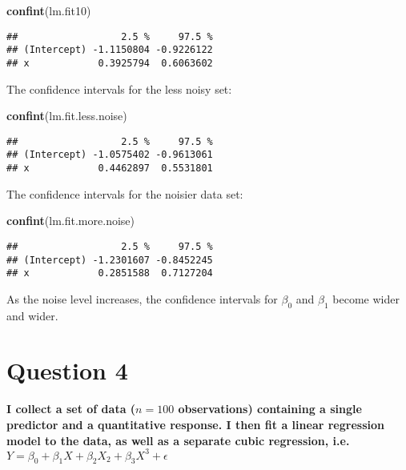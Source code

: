 \documentclass[
]{article}
\newenvironment{Shaded}{\begin{snugshade}}{\end{snugshade}}
\newcommand{\FunctionTok}[1]{\textcolor[rgb]{0.13,0.29,0.53}{\textbf{#1}}}
\newcommand{\NormalTok}[1]{#1}
\begin{document}
\begin{Shaded}
\begin{Highlighting}[]
\FunctionTok{confint}\NormalTok{(lm.fit10)}
\end{Highlighting}
\end{Shaded}

\begin{verbatim}
##                  2.5 %     97.5 %
## (Intercept) -1.1150804 -0.9226122
## x            0.3925794  0.6063602
\end{verbatim}

The confidence intervals for the less noisy set:

\begin{Shaded}
\begin{Highlighting}[]
\FunctionTok{confint}\NormalTok{(lm.fit.less.noise)}
\end{Highlighting}
\end{Shaded}

\begin{verbatim}
##                  2.5 %     97.5 %
## (Intercept) -1.0575402 -0.9613061
## x            0.4462897  0.5531801
\end{verbatim}

The confidence intervals for the noisier data set:

\begin{Shaded}
\begin{Highlighting}[]
\FunctionTok{confint}\NormalTok{(lm.fit.more.noise)}
\end{Highlighting}
\end{Shaded}

\begin{verbatim}
##                  2.5 %     97.5 %
## (Intercept) -1.2301607 -0.8452245
## x            0.2851588  0.7127204
\end{verbatim}

As the noise level increases, the confidence intervals for \(\beta_0\)
and \(\beta_1\) become wider and wider.

\hypertarget{question-4}{%
\section{Question 4}\label{question-4}}

\textbf{I collect a set of data (\(n=100\) observations) containing a
single predictor and a quantitative response. I then fit a linear
regression model to the data, as well as a separate cubic regression,
i.e.~\(Y=\beta_{0}+\beta_{1} X+\beta_{2} X_{2}+\beta_{3} X^{3}+\epsilon\)}
\end{document}
